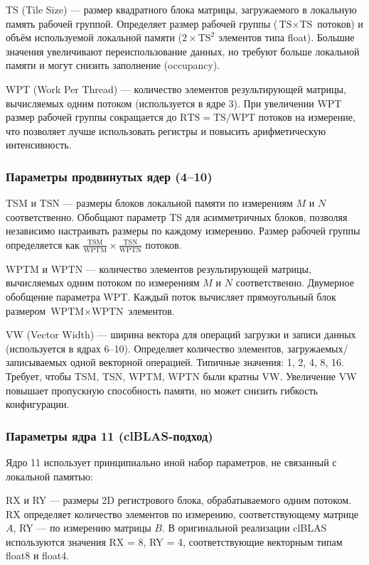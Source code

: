 TS (Tile Size) --- размер квадратного блока матрицы, загружаемого в локальную память рабочей группой. Определяет размер рабочей группы ($\text{TS} \times \text{TS}$ потоков) и объём используемой локальной памяти ($2 \times \text{TS}^2$ элементов типа float). Большие значения увеличивают переиспользование данных, но требуют больше локальной памяти и могут снизить заполнение (occupancy).

WPT (Work Per Thread) --- количество элементов результирующей матрицы, вычисляемых одним потоком (используется в ядре 3). При увеличении WPT размер рабочей группы сокращается до $\text{RTS} = \text{TS}/\text{WPT}$ потоков на измерение, что позволяет лучше использовать регистры и повысить арифметическую интенсивность.

\subsubsection{Параметры продвинутых ядер (4--10)}

TSM и TSN --- размеры блоков локальной памяти по измерениям $M$ и $N$ соответственно. Обобщают параметр TS для асимметричных блоков, позволяя независимо настраивать размеры по каждому измерению. Размер рабочей группы определяется как $\frac{\text{TSM}}{\text{WPTM}} \times \frac{\text{TSN}}{\text{WPTN}}$ потоков.

WPTM и WPTN --- количество элементов результирующей матрицы, вычисляемых одним потоком по измерениям $M$ и $N$ соответственно. Двумерное обобщение параметра WPT. Каждый поток вычисляет прямоугольный блок размером $\text{WPTM} \times \text{WPTN}$ элементов.

VW (Vector Width) --- ширина вектора для операций загрузки и записи данных (используется в ядрах 6--10). Определяет количество элементов, загружаемых/записываемых одной векторной операцией. Типичные значения: 1, 2, 4, 8, 16. Требует, чтобы TSM, TSN, WPTM, WPTN были кратны VW. Увеличение VW повышает пропускную способность памяти, но может снизить гибкость конфигурации.

\subsubsection{Параметры ядра 11 (clBLAS-подход)}

Ядро 11 использует принципиально иной набор параметров, не связанный с локальной памятью:

RX и RY --- размеры 2D регистрового блока, обрабатываемого одним потоком. RX определяет количество элементов по измерению, соответствующему матрице $A$, RY --- по измерению матрицы $B$. В оригинальной реализации clBLAS используются значения RX = 8, RY = 4, соответствующие векторным типам float8 и float4.

